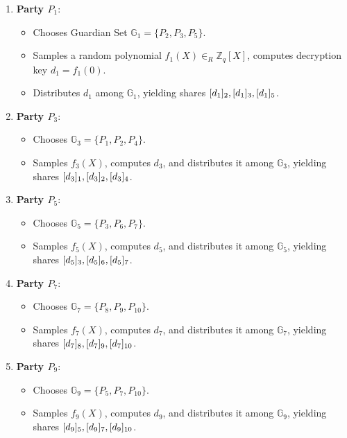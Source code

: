 \documentclass[runningheads]{llncs}
\begin{document}
\begin{enumerate}
    \item \textbf{Party $P_1$}:
        \begin{itemize}
            \item Chooses Guardian Set $\mathbb{G}_1 = \{P_2, P_3, P_5\}$.
            \item Samples a random polynomial $f_1(X) \in_R \mathbb{Z}_q[X]$, computes decryption key $d_1 = f_1(0)$.
            \item Distributes $d_1$ among $\mathbb{G}_1$, yielding shares $[d_{1}]_{2}, [d_{1}]_{3}, [d_{1}]_{5}$.
        \end{itemize}

    \item \textbf{Party $P_3$}:
        \begin{itemize}
            \item Chooses $\mathbb{G}_3 = \{P_1, P_2, P_4\}$.
            \item Samples $f_3(X)$, computes $d_3$, and distributes it among $\mathbb{G}_3$, yielding shares $[d_{3}]_{1}, [d_{3}]_{2}, [d_{3}]_{4}$.
        \end{itemize}

    \item \textbf{Party $P_5$}:
        \begin{itemize}
            \item Chooses $\mathbb{G}_5 = \{P_3, P_6, P_7\}$.
            \item Samples $f_5(X)$, computes $d_5$, and distributes it among $\mathbb{G}_5$, yielding shares $[d_{5}]_{3}, [d_{5}]_{6}, [d_{5}]_{7}$.
        \end{itemize}

    \item \textbf{Party $P_7$}:
        \begin{itemize}
            \item Chooses $\mathbb{G}_7 = \{P_8, P_9, P_{10}\}$.
            \item Samples $f_7(X)$, computes $d_7$, and distributes it among $\mathbb{G}_7$, yielding shares $[d_{7}]_{8}, [d_{7}]_{9}, [d_{7}]_{10}$.
        \end{itemize}

    \item \textbf{Party $P_9$}:
        \begin{itemize}
            \item Chooses $\mathbb{G}_9 = \{P_5, P_7, P_{10}\}$.
            \item Samples $f_9(X)$, computes $d_9$, and distributes it among $\mathbb{G}_9$, yielding shares $[d_{9}]_{5}, [d_{9}]_{7}, [d_{9}]_{10}$.
        \end{itemize}
\end{enumerate}
\end{document}
